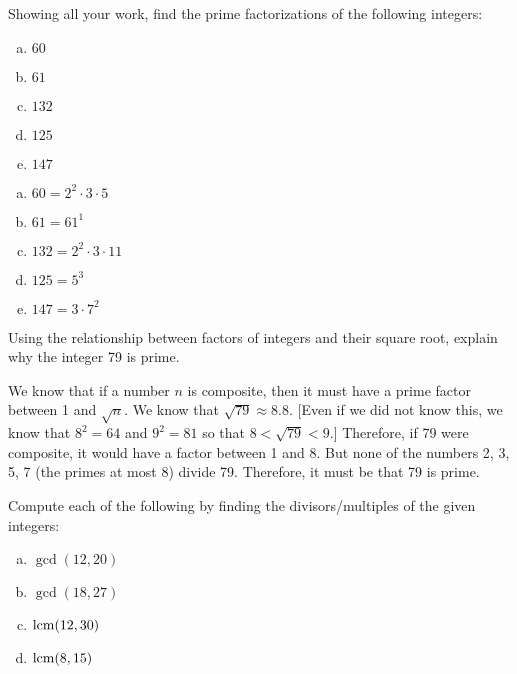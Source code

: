 \documentclass[11pt,letterpaper]{article}
\begin{document}
\newpage



 Showing all your work, find the prime factorizations of the following integers:
\begin{enumerate}[(a)]
\item $60$
\item $61$
\item $132$
\item $125$
\item $147$
\end{enumerate} \pspace

\sol
\begin{enumerate}[(a)]
\item $60= 2^2 \cdot 3 \cdot 5$
\item $61= 61^1$
\item $132= 2^2 \cdot 3 \cdot 11$
\item $125= 5^3$
\item $147= 3 \cdot 7^2$
\end{enumerate}



\newpage



 Using the relationship between factors of integers and their square root, explain why the integer 79 is prime. \pspace

\sol We know that if a number $n$ is composite, then it must have a prime factor between 1 and $\sqrt{n}$. We know that $\sqrt{79} \approx 8.8$. [Even if we did not know this, we know that $8^2= 64$ and $9^2= 81$ so that $8 < \sqrt{79} < 9$.] Therefore, if 79 were composite, it would have a factor between 1 and 8. But none of the numbers 2, 3, 5, 7 (the primes at most 8) divide 79. Therefore, it must be that 79 is prime. 



\newpage



 Compute each of the following by finding the divisors/multiples of the given integers:
\begin{enumerate}[(a)]
\item $\gcd(12, 20)$
\item $\gcd(18, 27)$
\item $\operatorname{lcm}(12, 30)$
\item $\operatorname{lcm}(8, 15)$
\end{enumerate} \pspace
\end{document}
